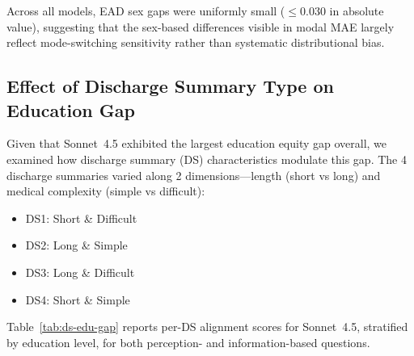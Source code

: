 Across all models, EAD sex gaps were uniformly small
($\le$0.030 in absolute value), suggesting that the sex-based differences
visible in modal MAE largely reflect mode-switching sensitivity rather
than systematic distributional bias.


\subsection{Effect of Discharge Summary Type on Education Gap}

Given that Sonnet~4.5 exhibited the largest education equity gap overall, we
examined how discharge summary (DS) characteristics modulate this gap. The 4
discharge summaries varied along 2 dimensions---length (short vs long) and
medical complexity (simple vs difficult):

\begin{itemize}\itemsep0pt
\item DS1: Short \& Difficult
\item DS2: Long \& Simple
\item DS3: Long \& Difficult
\item DS4: Short \& Simple
\end{itemize}

Table~\ref{tab:ds-edu-gap} reports per-DS alignment scores for Sonnet~4.5,
stratified by education level, for both perception- and information-based
questions.

